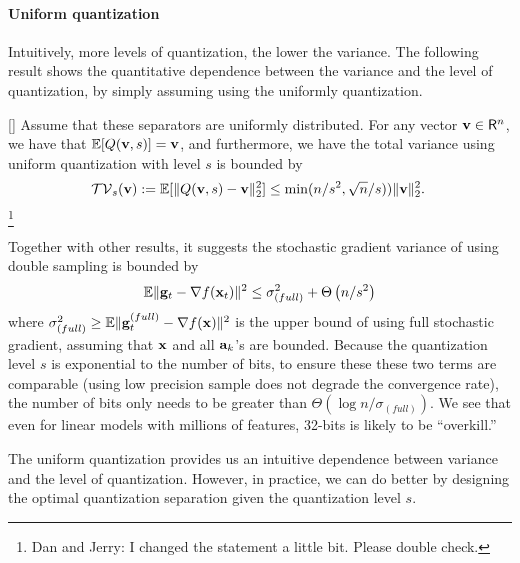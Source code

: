 \paragraph{Uniform quantization} Intuitively, more levels of quantization, the lower the variance. The following result shows the quantitative dependence between the variance and the level of quantization, by simply assuming using the uniformly quantization. 
\begin{lemma}
\label{lem:quant-facts} [\cite{Alistarh:2016:ArXiv}]
Assume that these separators are uniformly distributed. For any vector $\mathbf{v} \in \mathsf{R}^n$, we have that $\mathbb{E} [Q (\mathbf{v},s)] = \mathbf{v}$, and furthermore, we have the total variance using uniform quantization with level $s$ is bounded by
\[
\mathcal{TV}_s({\bf v}):=\mathbb{E} [\| Q (\mathbf{v},s) - {\bf v}\|_2^2] \leq \min( n/s^2,\sqrt{n}/s)) \| \mathbf{v} \|_2^2. \;
\]
\footnote{Dan and Jerry: I changed the statement a little bit. Please double check.}
\end{lemma} 
Together with other results, it suggests the stochastic gradient variance of using double sampling is bounded by
\[
\mathbb{E}\|{\bf g}_t - \nabla f({\bf x}_t)\|^2 \leq \sigma^2_{(full)} + \Theta \left( {n /s^2} \right)
\]
where $\sigma^2_{(full)} \geq \mathbb{E} \|{\bf g}_t^{(full)} - \nabla f({\bf x})\|^2$ is the upper bound of using full stochastic gradient, assuming that ${\bf x}$ and all ${\bf a}_k$'s are bounded. Because the quantization level $s$ is exponential to the number of bits, to ensure these these two terms are comparable (using low precision sample does not degrade the convergence rate), the number of bits only needs to be greater than $\Theta (\log n /\sigma_{(full)})$. We see that even for linear models with millions
of features, 32-bits is likely to be  ``overkill.''

The uniform quantization provides us an intuitive dependence between variance and the level of quantization. However, in practice, we can do better by designing the optimal quantization separation given the quantization level $s$. 
 

